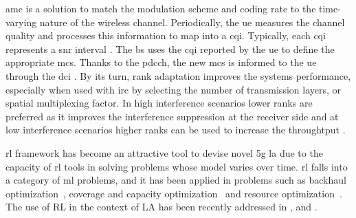 \Gls{amc} is a solution to match the modulation scheme and coding rate to the time-varying nature of the wireless channel.
%
Periodically, the \gls{ue} measures the channel quality and processes this information to map into a \gls{cqi}.
%
Typically, each \gls{cqi} represents a \gls{snr} interval \cite{Blanquez-Casado2016}.
%
The \gls{bs} uses the \gls{cqi} reported by the \gls{ue} to define the appropriate \gls{mcs}.
%
Thanks to the \gls{pdcch}, the new \gls{mcs} is informed to the \gls{ue} through the \gls{dci} \cite{ErikDahlman5G}.
%
By its turn, rank adaptation improves the systems performance, especially when used with \gls{irc} by selecting the number of transmission layers, or spatial multiplexing factor.
%
In high interference scenarios lower ranks are preferred as it improves the interference suppression at the receiver side and at low interference scenarios higher ranks can be used to increase the throughtput \cite{catania2015distributed}.
%

\Gls{rl} framework has become an attractive tool to devise novel \gls{5g} \gls{la} due to the capacity of \gls{rl} tools in solving problems whose model varies over time.
%
%
\Gls{rl} falls into a category of \gls{ml} problems, and it has been applied in problems \cite{survey-son} such as backhaul optimization~\cite{jaber2015}, coverage and capacity optimization~\cite{Fan2014} and resource optimization~\cite{Miozzo2017SwitchOnOffPF}.
%
The use of RL in the context of LA has been recently addressed in \cite{continuousState}, \cite{bruno2014robust} and \cite{DRL_AMC}.

%


